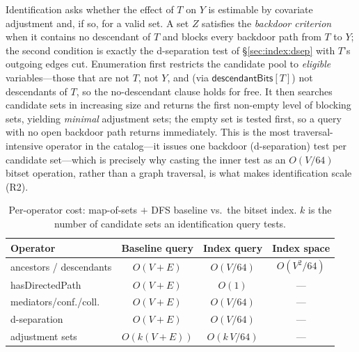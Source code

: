 Identification asks whether the effect of $T$ on $Y$ is estimable by covariate
adjustment and, if so, for a valid set. A set $Z$ satisfies the \emph{backdoor
criterion} when it contains no descendant of $T$ and blocks every backdoor path
from $T$ to $Y$; the second condition is exactly the d-separation test of
\S\ref{sec:index:dsep} with $T$'s outgoing edges cut. Enumeration first restricts
the candidate pool to \emph{eligible} variables---those that are not $T$, not $Y$,
and (via $\textsf{descendantBits}[T]$) not descendants of $T$, so the
no-descendant clause holds for free. It then searches candidate sets in
increasing size and returns the first non-empty level of blocking sets, yielding
\emph{minimal} adjustment sets; the empty set is tested first, so a query with no
open backdoor path returns immediately. This is the most traversal-intensive
operator in the catalog---it issues one backdoor (d-separation) test per
candidate set---which is precisely why casting the inner test as an $O(V/64)$
bitset operation, rather than a graph traversal, is what makes identification
scale (R2).

\begin{table}[t]\centering
\caption{Per-operator cost: map-of-sets $+$ DFS baseline vs.\ the bitset index.
$k$ is the number of candidate sets an identification query tests.}
\label{tab:complexity}
\begin{tabular}{@{}lccc@{}}
\toprule
Operator & Baseline query & Index query & Index space \\
\midrule
ancestors / descendants & $O(V{+}E)$ & $O(V/64)$ & $O(V^2/64)$ \\
hasDirectedPath         & $O(V{+}E)$ & $O(1)$     & --- \\
mediators/conf./coll.   & $O(V{+}E)$ & $O(V/64)$  & --- \\
d-separation            & $O(V{+}E)$ & $O(V/64)$  & --- \\
adjustment sets         & $O(k(V{+}E))$ & $O(k\,V/64)$ & --- \\
\bottomrule
\end{tabular}
\end{table}
